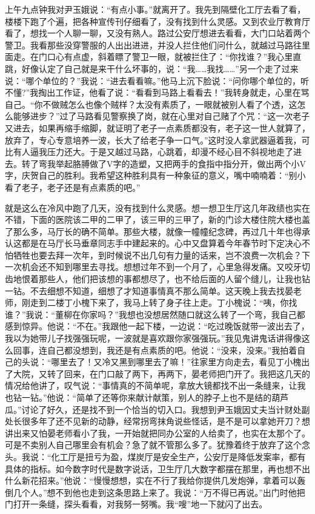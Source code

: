 \documentclass[12pt,oneside]{book}
\begin{document}
上午九点钟我对尹玉娥说：``有点小事。''就离开了。我先到隔壁化工厅去看了看，楼楼下跑了个遍，把各种宣传刊仔细看了，没有找到什么灵感。又到农业厅教育厅看了，想找一个人聊一聊，又没有熟人。路过公安厅想进去看看，大门口站着两个警卫。我看那些没穿警服的人出出进进，并没人拦住他们问什么，就越过马路往里面走。在门口心有点虚，斜着瞟了警卫一眼，就被拦住了：``你找谁？''我心里直跳，好像认定了自己就是来干什么坏事的，说：``我\ldots\ldots 我找\ldots\ldots{}''另一个走了过来说：``哪个单位的？''我说：``进去看看嘛。''他马上沉下脸说：``问你哪个单位的，听不懂?''我掏出工作证，他看了说：``看看到马路上看看去！''我转身就走，心里在骂自己。``你不做贼怎么也像个贼样？太没有素质了，一眼就被别人看了个透，这怎么能够进步？''过了马路看见警察换了岗，就在心里对自己赌了个咒：``这一次老子又进去，如果再缩手缩脚，就证明了老子一点素质都没有，老子这一世人就算了，放弃了，专心专意培养一波，长大了给老子争一口气。''这时没人拿武器逼着我，可比有人逼我压力还大。于是又越过马路，心跳着，却漫不经心目不斜视地走了进去。转了弯我举起胳膊做了V字的造塑，又把两手的食指中指分开，做出两个小V字，庆贺自己的胜利。我希望这种胜利具有一种象征的意义，嘴中喃喃着：``别小看了老子，老子还是有点素质的吧。''

就是这么在冷风中跑了几天，没有找到什么灵感。想一想卫生厅这几年政绩也实在不错，下面的医院该二甲的二甲了，该三甲的三甲了，新的门诊大楼住院大楼也盖了那么多，马厅长的确不简单。那些大楼，就像一幢幢纪念碑，再过几十年也得承认这都是在马厅长马垂章同志手中建起来的。心中又盘算着今年春节时下定决心不怕牺牲也要去拜一次年，到时候说不出几句有力量的话来，岂不浪费一次机会？下一次机会还不知到哪里去寻找。想想过年不到一个月了，心里急得发痛。又咬牙切齿地恨着那些人，他们把该想的事都想尽了，也不给后面的人留个缝儿，让我也钻一钻。不去细想不知道，细想了才知道事情真不那么简单。这天晚上我去找晏老师，刚走到二楼丁小槐下来了，我马上转了身子往上走。丁小槐说：``咦，你找谁？''我说：``董柳在你家吗？''我想也没想居然随口就这么转了一个弯，我自己都感到惊异。他说：``不在。''我跟他一起下楼，一边说：``吃过晚饭就带一波出去了，我以为她带儿子找强强玩呢，一波就是喜欢跟你家强强玩。''我见鬼讲鬼话讲得像这么回事，连自己都没想到，我还是有点素质的吧。他说：``没来，没来。''我拍着自己的头说：``哪里去了！又冷又黑到哪里去了嘛！''往家里方向走去，看见丁小槐出了大院，又转了回来，在门口敲了两下，再两下，晏老师把门开了。我把这几天的情况给他讲了，叹气说：``事情真的不简单呢，拿放大镜都找不出一条缝来，让我也钻一钻。''他说：``简单了还等你来献计献策，别人的脖子上也不是结的葫芦瓜。''讨论了好久，还是找不到一个恰当的切入口。我想到尹玉娥因丈夫当计财处副处长很多年了还不见新的动静，经常拐弯抹角说些怪话，是不是可以拿她开刀？想讲出来又怕晏老师看小了我，一开始就把同办公室的人给卖了，也实在太那个了。可是不卖别人自己哪里会有机会？急了就不管那么多了。犹豫着终于放弃了这个念头。我说：``化工厅是扭亏为盈，煤炭厅是安全生产，公安厅是降低发案率，都有具体的指标。如今数字时代是数字说话，卫生厅几大数字都摆在那里，再也想不出什么新花招来。''他说：``慢慢想想，实在不行了我给你提供几发炮弹，拿着可以轰倒几个人。''想不到他也走到这条思路上来了。我说：``万不得已再说。''出门时他把门打开一条缝，探头看看，对我努一努嘴。我``嗖''地一下就闪了出去。
\end{document}
